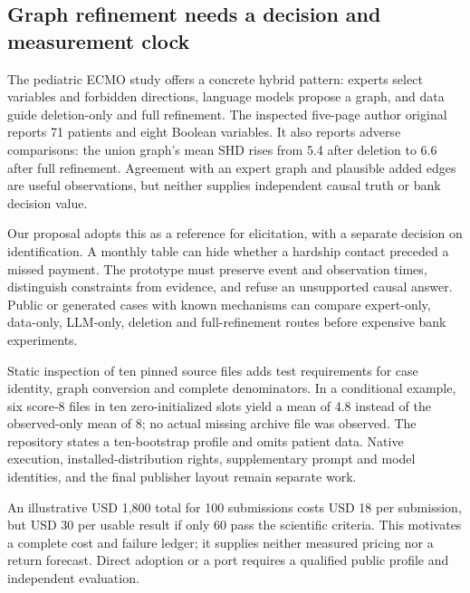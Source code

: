 \hypertarget{graph-refinement-needs-a-decision-and-measurement-clock}{%
\subsection{Graph refinement needs a decision and measurement
clock}\label{graph-refinement-needs-a-decision-and-measurement-clock}}

The pediatric ECMO study offers a concrete hybrid pattern: experts
select variables and forbidden directions, language models propose a
graph, and data guide deletion-only and full refinement. The inspected
five-page author original reports 71 patients and eight Boolean
variables. It also reports adverse comparisons: the union graph's mean
SHD rises from 5.4 after deletion to 6.6 after full refinement.
Agreement with an expert graph and plausible added edges are useful
observations, but neither supplies independent causal truth or bank
decision value. \citep{exec24_ecmo_original}

Our proposal adopts this as a reference for elicitation, with a separate
decision on identification. A monthly table can hide whether a hardship
contact preceded a missed payment. The prototype must preserve event and
observation times, distinguish constraints from evidence, and refuse an
unsupported causal answer. Public or generated cases with known
mechanisms can compare expert-only, data-only, LLM-only, deletion and
full-refinement routes before expensive bank experiments.
\citep{exec24_ecmo_reference}

Static inspection of ten pinned source files adds test requirements for
case identity, graph conversion and complete denominators. In a
conditional example, six score-8 files in ten zero-initialized slots
yield a mean of 4.8 instead of the observed-only mean of 8; no actual
missing archive file was observed. The repository states a ten-bootstrap
profile and omits patient data. Native execution, installed-distribution
rights, supplementary prompt and model identities, and the final
publisher layout remain separate work.
\citep{exec24_ecmo_code,exec24_ecmo_reference}

An illustrative USD 1,800 total for 100 submissions costs USD 18 per
submission, but USD 30 per usable result if only 60 pass the scientific
criteria. This motivates a complete cost and failure ledger; it supplies
neither measured pricing nor a return forecast. Direct adoption or a
port requires a qualified public profile and independent evaluation.
\citep{exec24_ecmo_reference}

